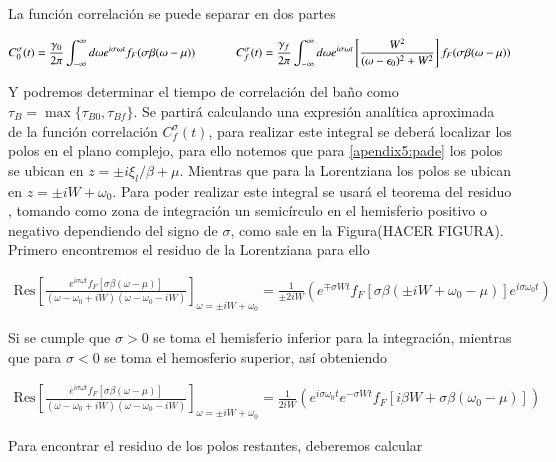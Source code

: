 \begin{appendixs}
La función correlación se puede separar en dos partes

\begin{equation*}
    C^{\sigma}_{0}(t) = \frac{\gamma_{0}}{2\pi} \int_{-\infty}^{\infty}d\omega e^{i\sigma \omega t} f_{F}(\sigma \beta (\omega-\mu)) \hspace{12mm} C^{\sigma}_{f}(t) = \frac{\gamma_{f}}{2\pi} \int_{-\infty}^{\infty}d\omega e^{i\sigma \omega t}\left[ \frac{W^{2}}{(\omega-\epsilon_{0})^{2} + W^{2}} \right] f_{F}(\sigma \beta (\omega-\mu))
\end{equation*}

Y podremos determinar el tiempo de correlación del baño como $\tau_{B} = \max\{\tau_{B0},\tau_{Bf}\}$. Se partirá calculando una expresión analítica aproximada de la función correlación $C^{\sigma}_{f}(t)$, para realizar este integral se deberá localizar los polos en el plano complejo, para ello notemos que para \ref{apendix5:pade} los polos se ubican en $z= \pm i \xi_{l}/\beta + \mu $. Mientras que para la Lorentziana los polos se ubican en $z = \pm i W + \omega_{0}$. Para poder realizar este integral se usará el teorema del residuo \cite{riley2006mathematical}, tomando como zona de integración un semicírculo en el hemisferio positivo o negativo dependiendo del signo de $\sigma$, como sale en la Figura(HACER FIGURA). Primero encontremos el residuo de la Lorentziana para ello 

\begin{align*}
   \text{Res} \left[ \frac{e^{ i\sigma \omega t} f_{F}[\sigma \beta (\omega-\mu)] }{ (\omega-\omega_{0} + iW)(\omega -\omega_{0} -iW)}\right]_{\omega = \pm i W + \omega_{0}} = \frac{1}{\pm 2iW} ( e^{\mp \sigma Wt} f_{F}[\sigma \beta(\pm iW +\omega_{0}-\mu)]e^{i\sigma \omega_{0}t}) 
\end{align*}

Si se cumple que $\sigma > 0$ se toma el hemisferio inferior para la integración, mientras que para $\sigma<0$ se toma el hemosferio superior, así obteniendo

\begin{align*}
    \text{Res} \left[ \frac{e^{ i\sigma \omega t} f_{F}[\sigma \beta (\omega-\mu)] }{ (\omega-\omega_{0} + iW)(\omega -\omega_{0} -iW)}\right]_{\omega = \pm i W + \omega_{0}} = \frac{1}{ 2iW} ( e^{i\sigma \omega_{0}t}e^{- \sigma Wt} f_{F}[i\beta W + \sigma \beta(\omega_{0}-\mu)]) 
 \end{align*}

Para encontrar el residuo de los polos restantes, deberemos calcular 


\end{appendixs}
